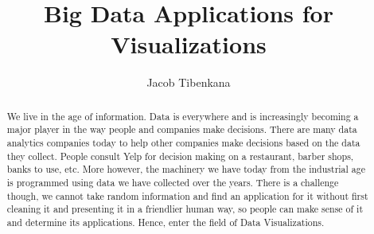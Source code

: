 \documentclass[sigconf]{acmart}
\begin{document}
\title{Big Data Applications for Visualizations}


\author{Jacob Tibenkana}

\renewcommand{\shortauthors}{J. Tibenkana}


\begin{abstract}
We live in the age of information. Data is everywhere and is increasingly becoming a major player in the way people and companies make decisions. There are many data analytics companies today to help other companies make decisions based on the data they collect. People consult Yelp for decision making on a restaurant, barber shops, banks to use, etc. More however, the machinery we have today from the industrial age is programmed using data we have collected over the years. There is a challenge though, we cannot take random information and find an application for it without first cleaning it and presenting it in a friendlier human way, so people can make sense of it and determine its applications. Hence, enter the field of Data Visualizations. 
\end{abstract}



\maketitle

\end{document}
